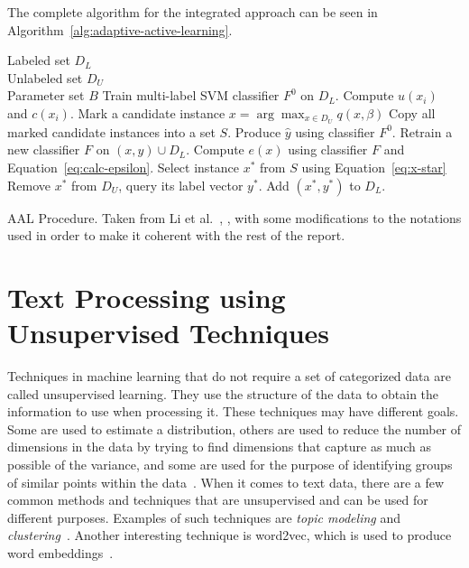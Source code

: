 The complete algorithm for the integrated approach can be seen in Algorithm~\ref{alg:adaptive-active-learning}.

\begin{algorithm}
    \begin{algorithmic}
        \REQUIRE Labeled set $D_L$ \\ 
                 Unlabeled set $D_U$ \\ 
                 Parameter set $B$
        \REPEAT
            \STATE Train multi-label SVM classifier $F^0$ on $D_L$.
                \STATE Compute $u(x_i)$ and $c(x_i)$.
            \ENDFOR
                \STATE Mark a candidate instance $x = \arg\max_{x \in D_U} q(x, \beta)$
            \ENDFOR
            \STATE Copy all marked candidate instances into a set $S$.
                \STATE Produce $\hat{y}$ using classifier $F^0$.
                \STATE Retrain a new classifier $F$ on $(x, \hat{y}) \cup D_L$.
                \STATE Compute $e(x)$ using classifier $F$ and Equation~\ref{eq:calc-epsilon}.
            \ENDFOR
            \STATE Select instance $x^*$ from $S$ using Equation~\ref{eq:x-star}
            \STATE Remove $x^*$ from $D_U$, query its label vector $y^*$.
            \STATE Add $(x^*, y^*)$ to $D_L$.
    \end{algorithmic}

    \caption{AAL Procedure. Taken from Li et al\@.~\cite{li2013active}, , with some modifications to the notations used in order to make it coherent with the rest of the report.}
    \label{alg:adaptive-active-learning}
\end{algorithm}


\section{Text Processing using Unsupervised Techniques}

Techniques in machine learning that do not require a set of categorized data are called unsupervised learning.
They use the structure of the data to obtain the information to use when processing it.
These techniques may have different goals.
Some are used to estimate a distribution, others are used to reduce the number of dimensions in the data by trying to find dimensions that capture as much as possible of the variance, and some are used for the purpose of identifying groups of similar points within the data~\cite{bishop2006pattern}.
When it comes to text data, there are a few common methods and techniques that are unsupervised and can be used for different purposes.
Examples of such techniques are \textit{topic modeling} and \textit{clustering}~\cite{aggarwal2012survey, crain2012dimensionality}.
Another interesting technique is word2vec, which is used to produce word embeddings~\cite{mikolov2013efficient}.

